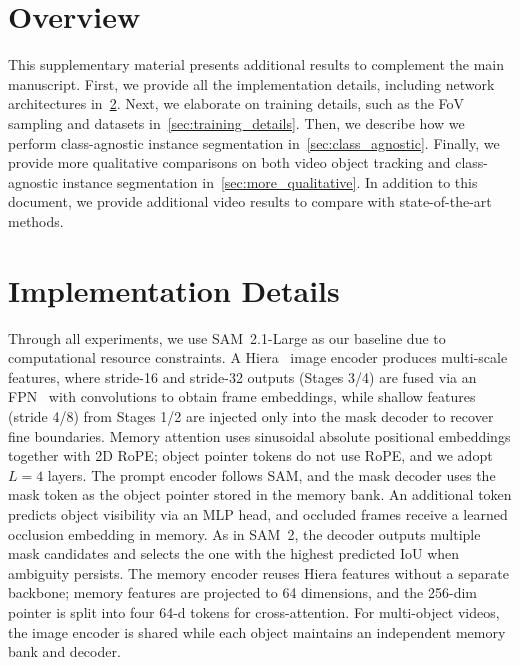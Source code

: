\section{Overview}
\label{sec:appendix_overview}
This supplementary material presents additional results to complement the main manuscript. 
First, we provide all the implementation details, including network architectures in~\cref{sec:details}.
Next, we elaborate on training details, such as the FoV sampling and datasets in~\cref{sec:training_details}.
Then, we describe how we perform class-agnostic instance segmentation in~\cref{sec:class_agnostic}.
Finally, we provide more qualitative comparisons on both video object tracking and class-agnostic instance segmentation in~\cref{sec:more_qualitative}.
In addition to this document, we provide additional video results to compare with state-of-the-art methods.


\section{Implementation Details} \label{sec:details}
Through all experiments, we use SAM~2.1-Large as our baseline due to computational resource constraints. A Hiera~\cite{ryali2023hiera} image encoder produces multi-scale features, where stride-16 and stride-32 outputs (Stages 3/4) are fused via an FPN~\cite{lin2017featureFPN} with convolutions to obtain frame embeddings, while shallow features (stride 4/8) from Stages 1/2 are injected only into the mask decoder to recover fine boundaries. Memory attention uses sinusoidal absolute positional embeddings together with 2D RoPE; object pointer tokens do not use RoPE, and we adopt $L=4$ layers. The prompt encoder follows SAM, and the mask decoder uses the mask token as the object pointer stored in the memory bank. An additional token predicts object visibility via an MLP head, and occluded frames receive a learned occlusion embedding in memory. As in SAM~2, the decoder outputs multiple mask candidates and selects the one with the highest predicted IoU when ambiguity persists. The memory encoder reuses Hiera features without a separate backbone; memory features are projected to 64 dimensions, and the 256-dim pointer is split into four 64-d tokens for cross-attention. For multi-object videos, the image encoder is shared while each object maintains an independent memory bank and decoder.
 
